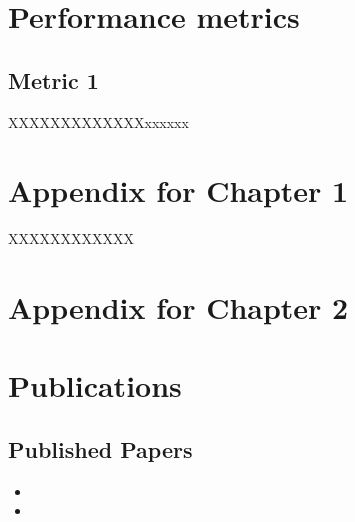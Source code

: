 
\inbpdocument



\chapter{Performance metrics}
\label{ch:appendix:pmetrics}

\section{Metric 1}

XXXXXXXXXXXXXxxxxxx



\chapter{Appendix for Chapter 1}

XXXXXXXXXXXX

\chapter{Appendix for Chapter 2}


\chapter{Publications}

\section{Published Papers}

\begin{itemize}
	\item {}
	\item {}
\end{itemize}






\outbpdocument{}